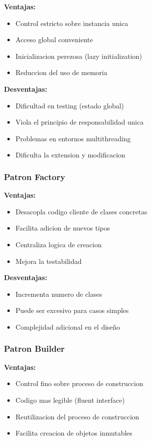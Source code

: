 \documentclass[11pt,a4paper]{article}
\begin{document}
\textbf{Ventajas:}
\begin{itemize}
    \item Control estricto sobre instancia unica
    \item Acceso global conveniente
    \item Inicializacion perezosa (lazy initialization)
    \item Reduccion del uso de memoria
\end{itemize}

\textbf{Desventajas:}
\begin{itemize}
    \item Dificultad en testing (estado global)
    \item Viola el principio de responsabilidad unica
    \item Problemas en entornos multithreading
    \item Dificulta la extension y modificacion
\end{itemize}

\subsubsection{Patron Factory}

\textbf{Ventajas:}
\begin{itemize}
    \item Desacopla codigo cliente de clases concretas
    \item Facilita adicion de nuevos tipos
    \item Centraliza logica de creacion
    \item Mejora la testabilidad
\end{itemize}

\textbf{Desventajas:}
\begin{itemize}
    \item Incrementa numero de clases
    \item Puede ser excesivo para casos simples
    \item Complejidad adicional en el diseño
\end{itemize}

\subsubsection{Patron Builder}

\textbf{Ventajas:}
\begin{itemize}
    \item Control fino sobre proceso de construccion
    \item Codigo mas legible (fluent interface)
    \item Reutilizacion del proceso de construccion
    \item Facilita creacion de objetos inmutables
\end{itemize}
\end{document}
